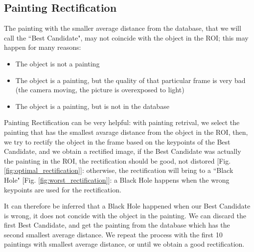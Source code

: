 \documentclass[10pt,twocolumn,letterpaper]{article}
\begin{document}
\subsection{Painting Rectification}
The painting with the smaller average distance from the database, that we will call the ``Best Candidate", may not coincide with the object in the ROI; this may happen for many reasons:
\begin{itemize}
  \item The object is not a painting
  \item The object is a painting, but the quality of that particular frame is very bad (the camera moving, the picture is overexposed to light)
  \item The object is a painting, but is not in the database
\end{itemize}
Painting Rectification can be very helpful: with painting retrival, we select the painting that has the smallest avarage distance from the object in the ROI, then, we try to rectify the object in the frame based on the keypoints of the Best Candidate, and we obtain a rectified image,
if the Best Candidate was actually the painting in the ROI, the rectification should be good, not distored [Fig. \ref{fig:optimal_rectification}]: otherwise, the rectification will bring to a ``Black Hole" [Fig. \ref{fig:worst_rectification}]: a Black Hole happens when the wrong keypoints are used for the rectification.

It can therefore be inferred that a Black Hole happened when our Best Candidate is wrong, it does not concide with the object in the painting.
We can discard the first Best Candidate, and get the painting from the database which has the second smallest average distance.
We repeat the process with the first 10 paintings with smallest average distance, or until we obtain a good rectification.
\end{document}
